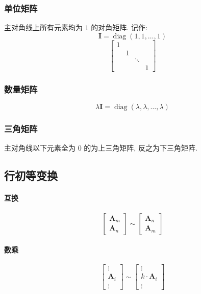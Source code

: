 \documentclass[UTF8]{ctexart}
\newcommand{\ve}[1]{\boldsymbol{\mathbf{#1}}}
\newcommand{\diag}{\operatorname{diag}}
\begin{document}
\subsubsection*{单位矩阵}
主对角线上所有元素均为 $ 1 $ 的对角矩阵. 记作:
\[ \ve I = \diag(1, 1, \dots, 1) \]
\[ \begin{bmatrix}
    1         &        &  &         \\
             & 1       &  &         \\
             &        & \ddots &   \\
             &        &  & 1 
\end{bmatrix} \]

\subsubsection*{数量矩阵}
\[ \lambda \ve I = \diag(\lambda, \lambda, \dots, \lambda) \]

\subsubsection*{三角矩阵}
主对角线以下元素全为 $ 0 $ 的为上三角矩阵, 反之为下三角矩阵.



\subsection{行初等变换}
\paragraph{互换}
\[ \begin{bmatrix}
    \ve A_m \\
    \ve A_n
\end{bmatrix}
\sim
\begin{bmatrix}
    \ve A_n \\
    \ve A_m
\end{bmatrix} \]

\paragraph{数乘}
\[ \begin{bmatrix}
    \vdots \\
    \ve A_i \\
    \vdots 
\end{bmatrix}
    \sim
\begin{bmatrix} 
    \vdots \\
    k \cdot  \ve A_i  \\
    \vdots
\end{bmatrix} \]
\end{document}
